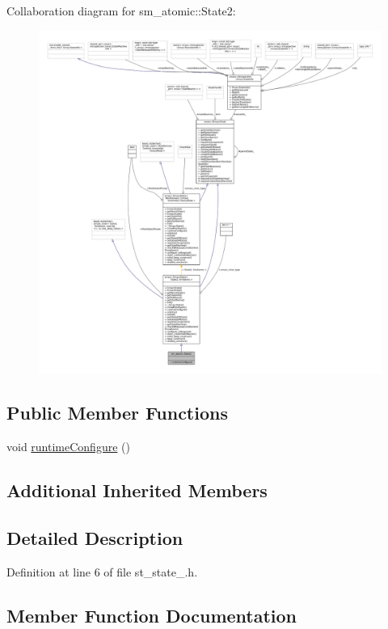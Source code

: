 Collaboration diagram for sm\+\_\+atomic\+:\+:State2\+:
\nopagebreak
\begin{figure}[H]
\begin{center}
\leavevmode
\includegraphics[width=350pt]{structsm__atomic_1_1State2__coll__graph}
\end{center}
\end{figure}
\subsection*{Public Member Functions}
\begin{DoxyCompactItemize}
\item 
void \hyperlink{structsm__atomic_1_1State2_afd749890e13d8aa36f1ac6645a5f7f9a}{runtime\+Configure} ()
\end{DoxyCompactItemize}
\subsection*{Additional Inherited Members}


\subsection{Detailed Description}


Definition at line 6 of file st\+\_\+state\+\_.\+h.



\subsection{Member Function Documentation}
